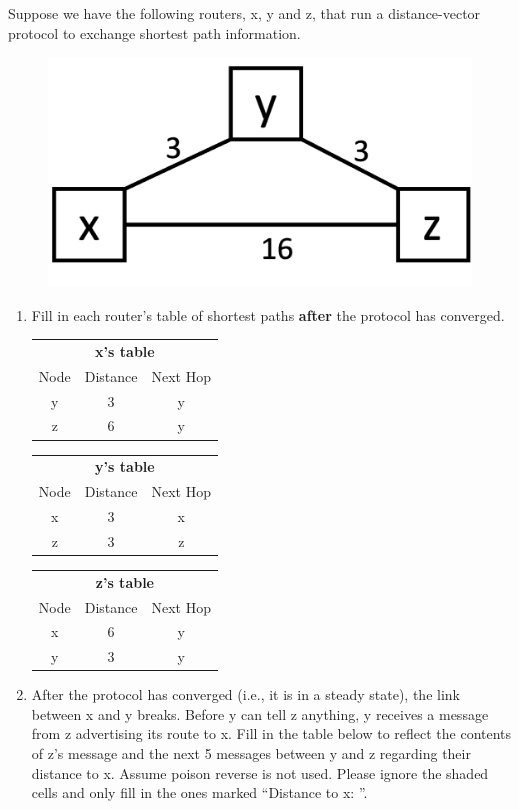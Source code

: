 \documentclass[10pt]{article}
\newenvironment{problem}[2][]{\begin{trivlist}
\item[\hskip \labelsep {\bfseries #1}\hskip \labelsep {\bfseries #2.}]}{\end{trivlist}}
\begin{document}
\begin{problem}{5: Distance-Vector}
Suppose we have the following routers, x, y and z, that run a distance-vector protocol to exchange shortest path information.
\begin{figure}[h]
    \centering
    \includegraphics[scale=0.3]{figures/dv_routing.pdf}
    \label{fig:bin_search}
\end{figure}
\begin{enumerate}[label=(\alph*)]
    \item Fill in each router's table of shortest paths \textbf{after} the protocol has converged. \\
    
\begin{tabular}{|c|c|c|}
\hline
\multicolumn{3}{|c|}{\textbf{x's table}}\\
\cline{1-3}
Node & Distance & Next Hop\\
\hline
y & 3 & y \\
\hline
z & 6 & y\\
\hline
\end{tabular}

\begin{tabular}{|c|c|c|}
\hline
\multicolumn{3}{|c|}{\textbf{y's table}}\\
\cline{1-3}
Node & Distance & Next Hop\\
\hline
x & 3 &x \\
\hline
z & 3&z \\
\hline
\end{tabular}

\begin{tabular}{|c|c|c|}
\hline
\multicolumn{3}{|c|}{\textbf{z's table}}\\
\cline{1-3}
Node & Distance & Next Hop\\
\hline
x & 6 & y\\
\hline
y & 3& y\\
\hline
\end{tabular}
    \item After the protocol has converged (i.e., it is in a steady state), the link between x and y breaks. Before y can tell z anything, y receives a message from z advertising its route to x. Fill in the table below to reflect the contents of z's message and the next 5 messages between y and z regarding their distance to x. Assume poison reverse is not used. Please ignore the shaded cells and only fill in the ones marked ``Distance to x: ''.  
    

\end{enumerate}
\end{problem}
\end{document}
